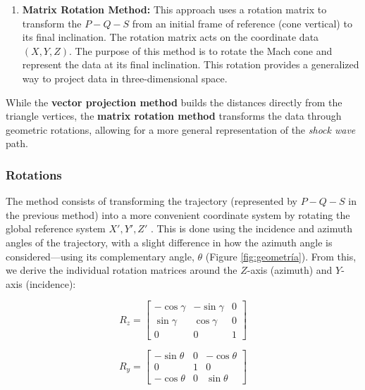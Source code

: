 \documentclass[linenum]{SSA-SRL}
\begin{document}
\begin{flushleft}
\begin{enumerate}
    \item \textbf{Matrix Rotation Method:} This approach uses a rotation matrix to transform the \( P-Q-S \) from an initial frame of reference  (cone vertical) to its final inclination. The rotation matrix acts on the coordinate data \( (X, Y, Z) \). The purpose of this method is to rotate the Mach cone and represent the data at its final inclination. This rotation provides a generalized way to project data in three-dimensional space.
   
\end{enumerate}

 While the \textbf{vector projection method} builds the distances directly from the triangle vertices, the \textbf{matrix rotation method} transforms the data through geometric rotations, allowing for a more general representation of the \textit{shock wave} path.


\subsubsection{Rotations}
The method consists of transforming the trajectory (represented by \( P-Q-S \) in the previous method) into a more convenient coordinate system by rotating the global reference system \( X', Y', Z' \) \cite{Ishihara_2004}. This is done using the incidence and azimuth angles of the trajectory, with a slight difference in how the azimuth angle is considered—using its complementary angle, \( \theta \) (Figure \ref{fig:geometría}). From this, we derive the individual rotation matrices around the \( Z \)-axis (azimuth) and \( Y \)-axis (incidence):

\vspace{0.4cm}
\begin{equation}
R_z = 
\begin{bmatrix}
-\cos{\gamma} & -\sin{\gamma} & 0 \\
\sin{\gamma} & \cos{\gamma} & 0 \\
0 & 0 & 1
\end{bmatrix}
\end{equation}

\vspace{0.4cm} %

\begin{equation}
R_y = 
\begin{bmatrix}
-\sin{\theta} & 0 & -\cos{\theta} \\
0 & 1 & 0 \\
-\cos{\theta} & 0 & \sin{\theta}
\end{bmatrix}
\end{equation}


\end{flushleft}
\end{document}
